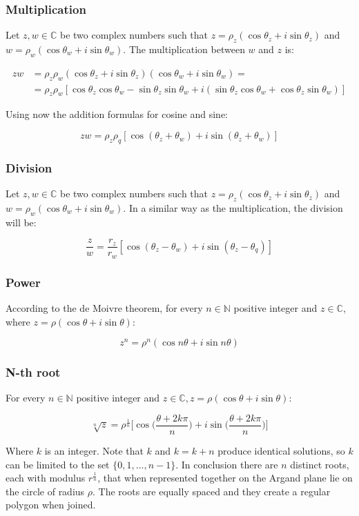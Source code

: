 		\subsubsection{Multiplication}
		Let $z, w\in\mathbb{C}$ be two complex numbers such that $z = \rho_z(\cos\theta_z + i\sin\theta_z)$ and $w = \rho_w(\cos\theta_w + i\sin\theta_w)$.
		The multiplication between $w$ and $z$ is:

		\begin{align*}
			zw &= \rho_z\rho_w(\cos\theta_z +i \sin\theta_z)(\cos\theta_w +i \sin\theta_w) =\\
				 &= \rho_z\rho_w[\cos\theta_z\cos\theta_w - \sin\theta_z\sin\theta_w + i(\sin\theta_z\cos\theta_w + \cos\theta_z\sin\theta_w)]
		\end{align*}

		Using now the addition formulas for cosine and sine:

		$$zw = \rho_z\rho_q[\cos(\theta_z+\theta_w) + i\sin(\theta_z+\theta_w)]$$

		\subsubsection{Division}
		Let $z, w\in\mathbb{C}$ be two complex numbers such that $z = \rho_z(\cos\theta_z + i\sin\theta_z)$ and $w = \rho_w(\cos\theta_w + i\sin\theta_w)$.
		In a similar way as the multiplication, the division will be:

		$$\frac{z}{w} = \frac{r_z}{r_w}[\cos(\theta_z-\theta_w) + i\sin(\theta_z-\theta_q)]$$

		\subsubsection{Power}
		According to the de Moivre theorem, for every $n\in\mathbb{N}$ positive integer and $z\in\mathbb{C}$, where $z = \rho(\cos\theta + i\sin\theta)$:

		$$z^n = \rho^n(\cos n\theta + i\sin n\theta)$$

		\subsubsection{N-th root}
		For every $n\in\mathbb{N}$ positive integer and $z\in\mathbb{C}, z = \rho(\cos\theta + i\sin\theta)$:

		$$\sqrt[n]{z} = \rho^{\frac{1}{n}}\biggl[\cos\biggl(\frac{\theta+2k\pi}{n}\biggr) + i\sin\biggl(\frac{\theta+2k\pi}{n}\biggr)\biggr]$$

		Where $k$ is an integer.
		Note that $k$ and $k=k+n$ produce identical solutions, so $k$ can be limited to the set $\{0,1,\dots, n-1\}$.
		In conclusion there are $n$ distinct roots, each with modulus $r^{\frac{1}{n}}$, that when represented together on the Argand plane lie on the circle of radius $\rho$. The roots are equally spaced and they create a regular polygon when joined.

